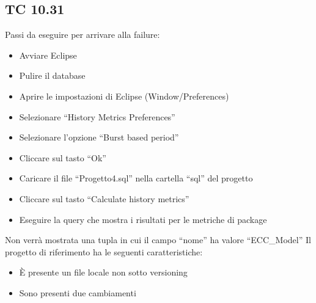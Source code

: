 \subsection*{TC 10.31}
Passi da eseguire per arrivare alla failure:
\begin{itemize}
 \item Avviare Eclipse
 \item Pulire il database
 \item Aprire le impostazioni di Eclipse (Window/Preferences)
 \item Selezionare ``History Metrics Preferences''
 \item Selezionare l'opzione ``Burst based period''
 \item Cliccare sul tasto ``Ok''
 \item Caricare il file ``Progetto4.sql'' nella cartella ``sql'' del progetto
 \item Cliccare sul tasto ``Calculate history metrics''
 \item Eseguire la query che mostra i risultati per le metriche di package
\end{itemize}
Non verrà mostrata una tupla in cui il campo ``nome'' ha valore ``ECC\_Model''
\vspace{0.5cm}
\newline
Il progetto di riferimento ha le seguenti caratteristiche:
\begin{itemize}
 \item È presente un file locale non sotto versioning
 \item Sono presenti due cambiamenti
\end{itemize}





\newpage





